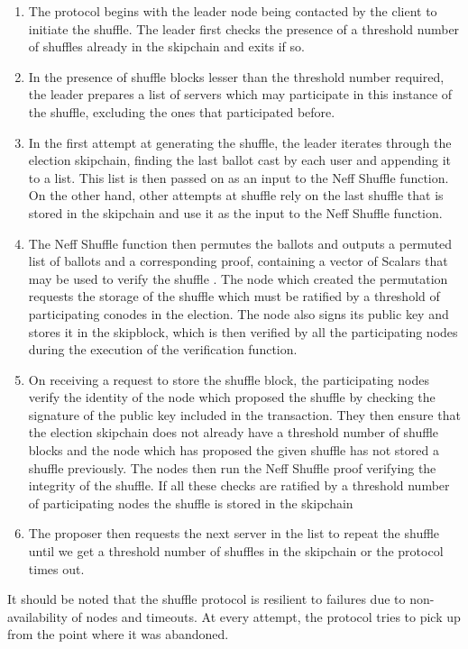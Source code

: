 \begin{enumerate}
  \item The protocol begins with the leader node being contacted by the client to initiate the shuffle. The leader first checks the presence of a threshold number of shuffles already in the skipchain and exits if so.
  \item In the presence of shuffle blocks lesser than the threshold number required, the leader prepares a list of servers which may participate in this instance of the shuffle, excluding the ones that participated before.
  \item In the first attempt at generating the shuffle, the leader iterates through the election skipchain, finding the last ballot cast by each user and appending it to a list. This list is then passed on as an input to the Neff Shuffle function. On the other hand, other attempts at shuffle rely on the last shuffle that is stored in the skipchain and use it as the input to the Neff Shuffle function.
  \item The Neff Shuffle function then permutes the ballots and outputs a permuted list of ballots and a corresponding proof, containing a vector of Scalars that may be used to verify the shuffle \cite{neff}. The node which created the permutation requests the storage of the shuffle which must be ratified by a threshold of participating conodes in the election. The node also signs its public key and stores it in the skipblock, which is then verified by all the participating nodes during the execution of the verification function.
  \item On receiving a request to store the shuffle block, the  participating nodes verify the identity of the node which proposed the shuffle by checking the signature of the public key included in the transaction. They then ensure that the election skipchain does not already have a threshold number of shuffle blocks and the node which has proposed the given shuffle has not stored a shuffle previously. The nodes then run the Neff Shuffle proof verifying the integrity of the shuffle. If all these checks are ratified by a threshold number of participating nodes the shuffle is stored in the skipchain
  \item The proposer then requests the next server in the list to repeat the shuffle until we get a threshold number of shuffles in the skipchain or the protocol times out.
\end{enumerate}

It should be noted that the shuffle protocol is resilient to failures due to non-availability of nodes and timeouts. At every attempt, the protocol tries to pick up from the point where it was abandoned.


